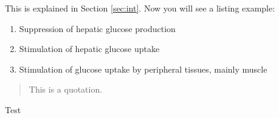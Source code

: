 	\label{sec:int}
	
	This is explained in Section \ref{sec:int}. Now you will see a listing example:
	\begin{enumerate}
	  \item Suppression of hepatic glucose production
	  \item Stimulation of hepatic glucose uptake
	  \item Stimulation of glucose uptake by peripheral tissues,
	  mainly muscle
	\end{enumerate}
	
	\begin{quotation}
	This is a quotation. \cite{HK}
	\end{quotation}
	
	
	Test

	\clearpage
	